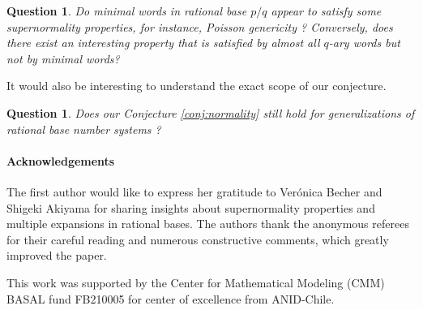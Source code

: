 \documentclass{template_arxiv}
\newtheorem{question}[theorem]{Question}
\numberwithin{equation}{section}
\begin{document}
\begin{question}
	Do minimal words in rational base $p/q$ appear to satisfy some supernormality properties, for instance, Poisson genericity \cite{ABM22}? Conversely, does there exist an interesting property that is satisfied by almost all $q$-ary words but not by minimal words?
\end{question}

It would also be interesting to understand the exact scope of our conjecture.

\begin{question}
	Does our Conjecture \ref{conj:normality} still hold for generalizations of rational base number systems \cite{AkiDraft,Ros25}?
\end{question}



 




\paragraph{Acknowledgements} The first author would like to express her gratitude to Ver\'onica Becher  and Shigeki Akiyama  for  sharing insights about supernormality properties and multiple expansions in rational bases. The authors thank the anonymous referees for their careful reading and numerous constructive comments, which greatly improved  the paper.




\noindent This work was supported by the Center for Mathematical Modeling (CMM) BASAL fund FB210005 for center of excellence from ANID-Chile.



{\small

}
\end{document}
